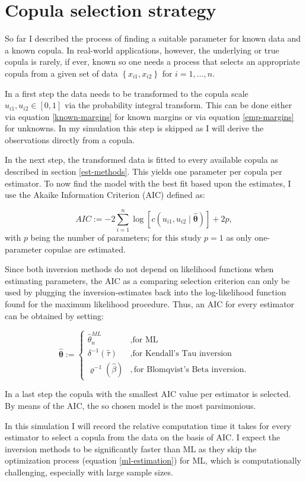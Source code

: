 \section{Copula selection strategy}

So far I described the process of finding a suitable parameter for known data and a known copula. In real-world applications, however, the underlying or true copula is rarely, if ever, known so one needs a process that selects an appropriate copula from a given set of data $\left\lbrace x_{i1},x_{i2}\right\rbrace$ for $i = 1,\dots , n$. 

In a first step the data needs to be transformed to the copula scale $u_{i1},u_{i2}\in \left[ 0,1 \right] $ via the probability integral transform. This can be done either via equation \ref{known-margins} for known margins or via equation \ref{emp-margins} for unknowns. In my simulation this step is skipped as I will derive the observations directly from a copula. 

In the next step, the transformed data is fitted to every available copula as described in section \ref{est-methods}. This yields one parameter per copula per estimator. To now find the model with the best fit based upon the estimates, I use the Akaike Information Criterion (AIC) \citep{akaike1973information} defined as:

\begin{equation}
	\label{AIC}
	AIC:=-2 \sum_{i=1}^{n} \log \left[c\left(u_{i1}, u_{i2} \mid \hat{\boldsymbol{\theta}}\right)\right]+2p,
\end{equation}
%
with $p$ being the number of parameters; for this study $p = 1$ as only one-parameter copulae are estimated.

Since both inversion methods do not depend on likelihood functions when estimating parameters, the AIC as a comparing selection criterion can only be used by plugging the inversion-estimates back into the log-likelihood function found for the maximum likelihood procedure. Thus, an AIC for every estimator can be obtained by setting:

\begin{equation}
	\label{estimators}
	\hat{\boldsymbol{\theta}} := \left\{\begin{array}{lll}
			\hat{\theta}_{n}^{ML} &, \text{for ML} \\
			\delta^{-1}(\hat{\tau}) &, \text{for Kendall's Tau inversion}\\
			\varrho^{-1}(\hat{\beta}) &, \text{for Blomqvist's Beta inversion}.
	\end{array}\right.
\end{equation}

In a last step the copula with the smallest AIC value per estimator is selected. By means of the AIC, the so chosen model is the most parsimonious. 

In this simulation I will record the relative computation time it takes for every estimator to select a copula from the data on the basis of AIC. I expect the inversion methods to be significantly faster than ML as they skip the optimization process (equation \ref{ml-estimation}) for ML, which is computationally challenging, especially with large sample sizes.